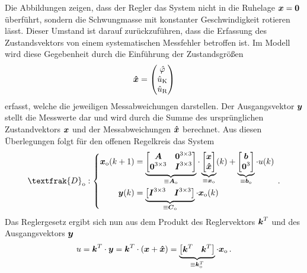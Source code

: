 Die Abbildungen zeigen, dass der Regler das System nicht in die Ruhelage $\boldsymbol{x}=\boldsymbol{0}$ überführt, sondern die Schwungmasse mit konstanter Geschwindigkeit rotieren lässt. Dieser Umstand ist darauf zurückzuführen, dass die Erfassung des Zustandsvektors von einem systematischen Messfehler betroffen ist. Im Modell wird diese Gegebenheit durch die Einführung der Zustandsgrößen
\begin{equation}
\boldsymbol{\hat{x}} = \begin{pmatrix}
\hat{\varphi} \\ \hat{u}_{\text{K}} \\ \hat{u}_{\text{R}}
\end{pmatrix}
\end{equation}
erfasst, welche die jeweiligen Messabweichungen darstellen. Der Ausgangsvektor $\boldsymbol{y}$ stellt die Messwerte dar und wird durch die Summe des ursprünglichen Zustandvektors $\boldsymbol{x}$ und der Messabweichungen $\boldsymbol{\hat{x}}$ berechnet. Aus diesen Überlegungen folgt für den offenen Regelkreis das System
\begin{equation}
\textfrak{D}\idx{o} : \left\{ \begin{split}
\bs{x}\idx{o}(k+1) &= \underbrace{\begin{bmatrix}
\bs{A} & \bs{0}^{3\times 3} \\ \bs{0}^{3\times 3} & \bs{I}^{3\times 3}\end{bmatrix}}_{\equiv \bs{A}\idx{o}}\cdot \underbrace{\begin{bmatrix}
\bs{x} \\ \bs{\hat{x}}
\end{bmatrix}}_{\equiv \bs{x}\idx{o}}(k) + \underbrace{\begin{bmatrix}
\bs{b} \\ \bs{0}^3 \end{bmatrix}}_{\equiv \bs{b}\idx{o}} \cdot u(k)
\\
\bs{y}(k) &= \underbrace{\begin{bmatrix}
\bs{I}^{3\times 3} & \bs{I}^{3\times 3}\end{bmatrix}}_{\equiv \bs{C}\idx{o}}\cdot \bs{x}\idx{o}(k)
\end{split}
\right. \,.
\end{equation}
Das Reglergesetz ergibt sich nun aus dem Produkt des Reglervektors $\boldsymbol{k}^T$ und des Ausgangsvektors $\boldsymbol{y}$
\begin{equation}
u = \boldsymbol{k}^T\cdot \boldsymbol{y} = \boldsymbol{k}^T \cdot (\boldsymbol{x} + \boldsymbol{\hat{x}}) = \underbrace{\begin{bmatrix}
\boldsymbol{k}^T & \boldsymbol{k}^T
\end{bmatrix}}_{\equiv \boldsymbol{k}^T_{\text{o}}} \cdot \boldsymbol{x}_{\text{o}} \,.
\end{equation}
